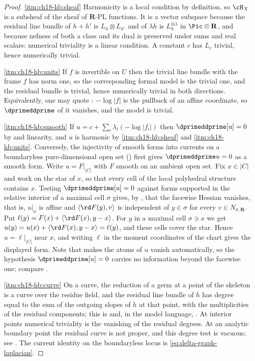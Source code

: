 \begin{proof}
\cref{itm:ch18-hb:sheaf} Harmonicity is a local condition by definition, so
$\cH_X$ is a subsheaf of the sheaf of $\mathbf R$-PL functions.  It is a
vector subspace because the residual line bundle of $h+h'$ is
$L_h\otimes L_{h'}$ and of $\lambda h$ is $L_h^{\otimes\lambda}$ in
$\Pic\otimes\mathbf R$, and because nefness of both a class and its dual is
preserved under sums and real scalars: numerical triviality is a linear
condition.  A constant $c$ has $L_c$ trivial, hence numerically trivial.

\cref{itm:ch18-hb:units} If $f$ is invertible on $U$ then the trivial line
bundle with the frame $f$ has norm one, so the corresponding formal model is
the trivial one, and the residual bundle is trivial, hence numerically
trivial in both directions.  Equivalently, one may quote
: $-\log|f|$ is the pullback of an affine
coordinate, so $\dprimeddprime$ of it vanishes, and the model is trivial.

\cref{itm:ch18-hb:smooth} If $u=c+\sum_i\lambda_i(-\log|f_i|)$ then
$\dprimeddprime[u]=0$ by  and linearity, and $u$ is
harmonic by \cref{itm:ch18-hb:sheaf} and \cref{itm:ch18-hb:units}.
Conversely, the injectivity of smooth forms into currents on a
boundaryless pure-dimensional open set
(\cite[Corollary~7.3.9]{CLD25}) first gives
$\dprimeddprime u=0$ as a smooth form.  Write $u=F|_{|C|}$ with $F$
smooth on an ambient open set.  Fix $x\in|C|$ and work on the star of $x$,
so that
every cell of the local polyhedral structure contains $x$.  Testing
$\dprimeddprime[u]=0$ against forms supported in the relative interior of a
maximal cell $\sigma$ gives, by
, that the facewise Hessian vanishes, that is,
$u|_\sigma$ is affine and $\langle \rd F(y),v\rangle$ is independent of
$y\in\sigma$ for every $v\in N_{\sigma,\mathbf R}$.  Put
$\ell(y)=F(x)+\langle \rd F(x),y-x\rangle$.  For $y$ in a maximal cell
$\sigma\ni x$ we get $u(y)=u(x)+\langle \rd F(x),y-x\rangle=\ell(y)$, and
these cells cover the star.  Hence $u=\ell|_{|C|}$ near $x$, and writing
$\ell$ in the moment coordinates of the chart gives the displayed form.
Note that  makes the atoms of $u$ vanish
automatically, so the hypothesis $\dprimeddprime[u]=0$ carries no
information beyond the facewise one; compare
.

\cref{itm:ch18-hb:curve} On a curve, the reduction of a germ at a point of
the skeleton is a curve over the residue field, and the residual line bundle
of $h$ has degree equal to the sum of the outgoing slopes of $h$ at that
point, with the multiplicities of the residual components; this is
\cite[Proposition~15.7]{GJR26} and, in the model language,
.  At interior points numerical
triviality is the vanishing of the residual degrees.  At an analytic
boundary point the residual curve is not proper, and this degree test is
vacuous; see \cite[Corollary~5.4 and its proof]{GR25PL}.  The current
identity on the boundaryless locus is \eqref{eq:delta-graph-laplacian}.
\end{proof}

